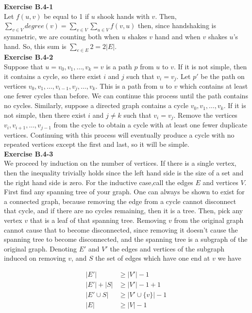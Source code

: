 \documentclass{article}
\begin{document}
\noindent\textbf{Exercise B.4-1}\\
Let $f(u,v)$ be equal to 1 if $u$ shook hands with $v$. Then, $\sum_{v\in V} degree(v) = \sum_{v\in V} \sum_{u\in V} f(v,u)$ then, since handshaking is symmetric, we are counting both when $u$ shakes $v$ hand and when $v$ shakes $u$'s hand. So, this sum is $\sum_{e\in E} 2 = 2|E|$.\\

\noindent\textbf{Exercise B.4-2}\\

Suppose that $u = v_0, v_1, \ldots, v_k = v$ is a path $p$ from $u$ to $v$.  If it is not simple, then it contains a cycle, so there exist $i$ and $j$ such that $v_i = v_j$.  Let $p'$ be the path on vertices $v_0, v_1, \ldots, v_{i-1}, v_j, \ldots, v_k$.  This is a path from $u$ to $v$ which contains at least one fewer cycles than before.  We can continue this process until the path contains no cycles. Similarly, suppose a directed graph contains a cycle $v_0, v_1, \ldots, v_k$.  If it is not simple, then there exist $i$ and $j \neq k$ such that $v_i = v_j$.  Remove the vertices $v_i, v_{i+1}, \ldots, v_{j-1}$ from the cycle to obtain a cycle with at least one fewer duplicate vertices.  Continuing with this process will eventually produce a cycle with no repeated vertices except the first and last, so it will be simple. \\


\noindent\textbf{Exercise B.4-3}\\
We proceed by induction on the number of vertices. If there is a single vertex, then the inequality trivially holds since the left hand side is the size of a set and the right hand side is zero. For the inductive case,call the edges $E$ and vertices $V$. First find any spanning tree of your graph. One can always be shown to exist for a connected graph, because removing the edge from a cycle cannot disconnect that cycle, and if there are no cycles remaining, then it is a tree. Then, pick any vertex $v$ that is a leaf of that spanning tree. Removing $v$ from the original graph cannot cause that to become disconnected, since removing it doesn't cause the spanning tree to become disconnected, and the spanning tree is a subgraph of the original graph. Denoting $E'$ and $V'$ the edges and vertices of the subgraph induced on removing $v$, and $S$ the set of edges which have one end at $v$ we have

\begin{align*}
|E'| &\ge |V'|-1\\
|E'| + |S| &\ge |V'|-1 +1\\
|E' \cup S| &\ge |V' \cup \{v\}| -1\\
|E| &\ge |V|-1
\end{align*}\\
\end{document}
